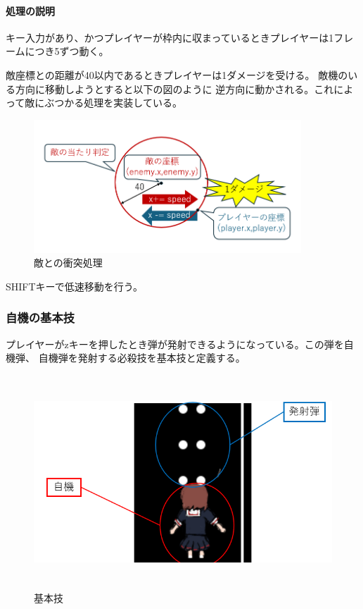 \documentclass[a4paper,titlepage,11pt]{ltjsarticle}
\begin{document}
\paragraph{処理の説明}

キー入力があり、かつプレイヤーが枠内に収まっているときプレイヤーは1フレームにつき5ずつ動く。

敵座標との距離が40以内であるときプレイヤーは1ダメージを受ける。
敵機のいる方向に移動しようとすると以下の図のように
逆方向に動かされる。これによって敵にぶつかる処理を実装している。
\begin{figure}[H]
	\begin{center}
		\includegraphics*[height = 5cm]{enemy_reject.png}
		\caption{敵との衝突処理}
	\end{center}
\end{figure}

SHIFTキーで低速移動を行う。
\subsubsection{自機の基本技}
プレイヤーがzキーを押したとき弾が発射できるようになっている。この弾を自機弾、
自機弾を発射する必殺技を基本技と定義する。
\begin{figure}[H]
\begin{center}
\includegraphics*[height = 8cm]{basic_avility.png}
\caption{基本技}
\end{center}
\end{figure}
\end{document}
